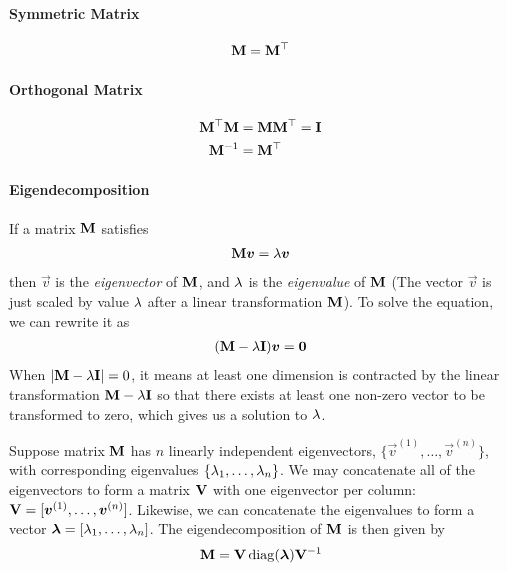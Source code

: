 \paragraph{Symmetric Matrix}

\begin{align*}
	\mathbf{M}=\mathbf{M}{}^\top
\end{align*}

\paragraph{Orthogonal Matrix}

\begin{align*}
	\mathbf{M}{}^\top\mathbf{M}&=\mathbf{M}\mathbf{M}{}^\top=\mathbf{I} \\
	\mathbf{M}^{-1}&=\mathbf{M}{}^\top
\end{align*}

\paragraph{Eigendecomposition}

If a matrix $\mathbf{M}$ satisfies
\begin{align*}
	\mathbf{M}\boldsymbol{v}=\lambda\boldsymbol{v}
\end{align*}
then $\vec{v}$ is the \emph{eigenvector} of $\mathbf{M}$, and $\lambda$ is the \emph{eigenvalue} of $\mathbf{M}$ (The vector $\vec{v}$ is just scaled by value $\lambda$ after a linear transformation $\mathbf{M}$). To solve the equation, we can rewrite it as
\begin{align*}
	(\mathbf{M}-\lambda\mathbf{I})\boldsymbol{v}=\boldsymbol{0}
\end{align*}
When $\left\vert \mathbf{M}-\lambda\mathbf{I} \right\vert=0$, it means at least one dimension is contracted by the linear transformation $\mathbf{M}-\lambda\mathbf{I}$ so that there exists at least one non-zero vector to be transformed to zero, which gives us a solution to $\lambda$.

Suppose matrix $\mathbf{M}$ has $n$ linearly independent eigenvectors, $\{\vec{v}^{(1)},\dotsc,\vec{v}^{(n)}\}$, with corresponding eigenvalues $\{\lambda_1,\dotsc,\lambda_n\}$. We may concatenate all of the eigenvectors to form a matrix $\mathbf{V}$ with one eigenvector per column: $\mathbf{V}=[\boldsymbol{v}^{(1)},\dotsc,\boldsymbol{v}^{(n)}]$. Likewise, we can concatenate the eigenvalues to form a vector $\boldsymbol{\lambda}=[\lambda_1,\dotsc,\lambda_n]$. The eigendecomposition of $\mathbf{M}$ is then given by
\begin{align*}
	\mat{M}=\mat{V}\diag(\vec{\la})\mat{V}\inv
\end{align*}

